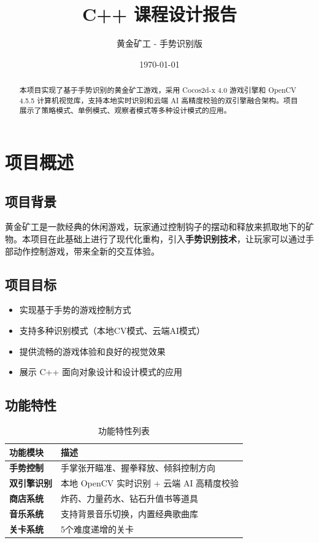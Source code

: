 \documentclass{article}
\title{C++ 课程设计报告}
\author{黄金矿工 - 手势识别版}
\date{\today}
\begin{document}
\maketitle

\begin{abstract}
本项目实现了基于手势识别的黄金矿工游戏，采用 Cocos2d-x 4.0 游戏引擎和 OpenCV 4.5.5 计算机视觉库，支持本地实时识别和云端 AI 高精度校验的双引擎融合架构。项目展示了策略模式、单例模式、观察者模式等多种设计模式的应用。
\end{abstract}

\tableofcontents
\newpage

\section{项目概述}

\subsection{项目背景}

黄金矿工是一款经典的休闲游戏，玩家通过控制钩子的摆动和释放来抓取地下的矿物。本项目在此基础上进行了现代化重构，引入\textbf{手势识别技术}，让玩家可以通过手部动作控制游戏，带来全新的交互体验。

\subsection{项目目标}

\begin{itemize}[leftmargin=*]
    \item 实现基于手势的游戏控制方式
    \item 支持多种识别模式（本地CV模式、云端AI模式）
    \item 提供流畅的游戏体验和良好的视觉效果
    \item 展示 C++ 面向对象设计和设计模式的应用
\end{itemize}

\subsection{功能特性}

\begin{table}[H]
\centering
\small
\begin{tabular}{|l|l|}
\hline
\textbf{功能模块} & \textbf{描述} \\
\hline
\textbf{手势控制} & 手掌张开瞄准、握拳释放、倾斜控制方向 \\
\hline
\textbf{双引擎识别} & 本地 OpenCV 实时识别 + 云端 AI 高精度校验 \\
\hline
\textbf{商店系统} & 炸药、力量药水、钻石升值书等道具 \\
\hline
\textbf{音乐系统} & 支持背景音乐切换，内置经典歌曲库 \\
\hline
\textbf{关卡系统} & 5个难度递增的关卡 \\
\hline
\end{tabular}
\caption{功能特性列表}
\end{table}
\end{document}
